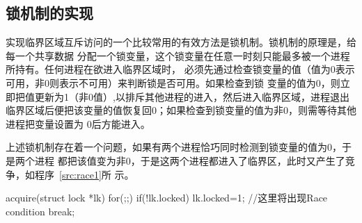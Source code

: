 \documentclass{swfuthesism}
\begin{document}

\subsection{锁机制的实现}
\label{sec:lock}

实现临界区域互斥访问的一个比较常用的有效方法是锁机制。锁机制的原理是，给每一个共享数据
分配一个锁变量，这个锁变量在任意一时刻只能最多被一个进程所持有。任何进程在欲进入临界区域时，
必须先通过检查锁变量的值（值为0表示可用，非0则表示不可用）来判断锁是否可用。如果检查到锁
变量的值为0，则立即把值更新为1（非0值）,以排斥其他进程的进入，然后进入临界区域，进程退出
临界区域后便把该变量的值恢复回0；如果检查到锁变量的值为非0，则需等待其他进程把变量设置为
0后方能进入。

上述锁机制存在着一个问题，如果有两个进程恰巧同时检测到锁变量的值为0，于是两个进程
都把该值变为非0，于是这两个进程都进入了临界区，此时又产生了竞争，如程序~\ref{src:race1}所
示。

\begin{listing}[H]
  \begin{codeblock}
\begin{ccode}
acquire(struct lock *lk){
  for(;;){
    if(!lk.locked) {
      lk.locked=1; //这里将出现Race condition
      break;
    }
  }
}
\end{ccode}
  \end{codeblock}
  \label{src:race1}
\end{listing}
\end{document}
